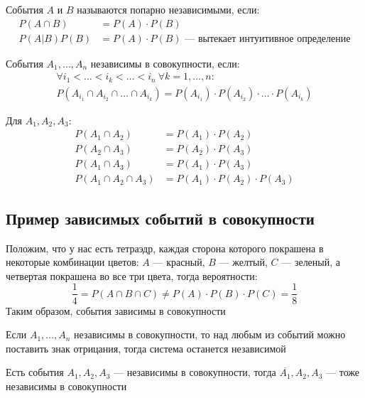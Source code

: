 \documentclass[a4paper, 10pt]{article}
\begin{document}
 События $A\text{ и }B$ называются попарно независимыми, если:
\begin{equation*}
    \begin{aligned}
        P(A\cap B)&=P(A)\cdot P(B)\\
        P(A|B)P(B)&=P(A)\cdot P(B)\text{ — вытекает интуитивное определение}
    \end{aligned}
\end{equation*}

 События $A_1,\ldots, A_n$ независимы в совокупности, если:
\begin{equation*}
    \begin{aligned}
    \forall i_1<\ldots<i_k<\ldots<i_n\ \forall k=1,\ldots,n:\\ P(A_{i_1}\cap A_{i_2}\cap\ldots\cap A_{i_k})=P(A_{i_1})\cdot P(A_{i_2})\cdot \ldots\cdot P(A_{i_k})
    \end{aligned}
\end{equation*}

\comment  Для $A_1,A_2,A_3$:
\begin{equation*}
    \begin{aligned}
        P(A_1\cap A_2)&=P(A_1)\cdot P(A_2)\\
        P(A_2\cap A_3)&=P(A_2)\cdot P(A_3)\\
        P(A_1\cap A_3)&=P(A_1)\cdot P(A_3)\\
        P(A_1\cap A_2\cap A_3)&=P(A_1)\cdot P(A_2)\cdot P(A_3)
    \end{aligned}
\end{equation*}

\subsection{Пример зависимых событий в совокупности}
Положим, что у нас есть тетраэдр, каждая сторона которого покрашена в некоторые комбинации цветов: $A$ — красный, $B$ — желтый, $C$ — зеленый, а четвертая покрашена во все три цвета, тогда вероятности:
\begin{equation*}
    \frac{1}{4}=P(A\cap B\cap C)\ne P(A)\cdot P(B)\cdot P(C)=\frac{1}{8}
\end{equation*}
Таким образом, события зависимы в совокупности

\comment Если $A_1,\ldots, A_n$ независимы в совокупности, то над любым из событий можно поставить знак отрицания, тогда система останется независимой

\ex Есть события $A_1,A_2,A_3$ — независимы в совокупности, тогда $\overline{A_1},A_2,A_3$ — тоже независимы в совокупности
\end{document}
